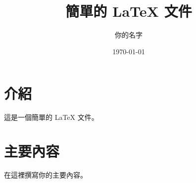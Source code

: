 \documentclass{article}
\title{簡單的 LaTeX 文件}
\author{你的名字}
\date{\today}
\begin{document}
\maketitle

\section{介紹}
這是一個簡單的 LaTeX 文件。

\section{主要內容}
在這裡撰寫你的主要內容。


\end{document}

